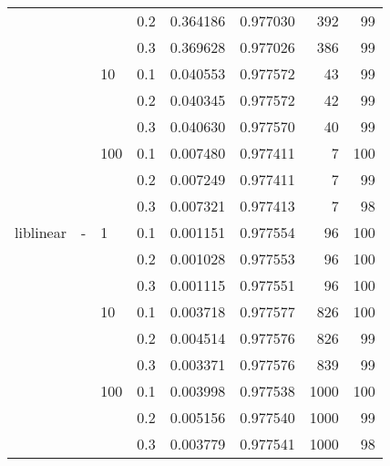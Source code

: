\begin{table}[H]
\begin{tabular}{llllrrrr}
          &   &     & 0.2 &  0.364186 &  0.977030 &     392 &    99 \\
          &   &     & 0.3 &  0.369628 &  0.977026 &     386 &    99 \\
          &   & 10  & 0.1 &  0.040553 &  0.977572 &      43 &    99 \\
          &   &     & 0.2 &  0.040345 &  0.977572 &      42 &    99 \\
          &   &     & 0.3 &  0.040630 &  0.977570 &      40 &    99 \\
          &   & 100 & 0.1 &  0.007480 &  0.977411 &       7 &   100 \\
          &   &     & 0.2 &  0.007249 &  0.977411 &       7 &    99 \\
          &   &     & 0.3 &  0.007321 &  0.977413 &       7 &    98 \\
liblinear & - & 1   & 0.1 &  0.001151 &  0.977554 &      96 &   100 \\
          &   &     & 0.2 &  0.001028 &  0.977553 &      96 &   100 \\
          &   &     & 0.3 &  0.001115 &  0.977551 &      96 &   100 \\
          &   & 10  & 0.1 &  0.003718 &  0.977577 &     826 &   100 \\
          &   &     & 0.2 &  0.004514 &  0.977576 &     826 &    99 \\
          &   &     & 0.3 &  0.003371 &  0.977576 &     839 &    99 \\
          &   & 100 & 0.1 &  0.003998 &  0.977538 &    1000 &   100 \\
          &   &     & 0.2 &  0.005156 &  0.977540 &    1000 &    99 \\
          &   &     & 0.3 &  0.003779 &  0.977541 &    1000 &    98 \\
\bottomrule
\end{tabular}
\end{table}
